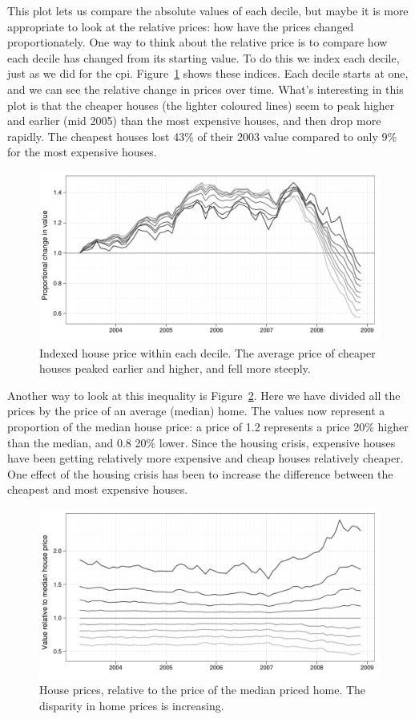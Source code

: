 \documentclass[oneside]{article}
\begin{document}
This plot lets us compare the absolute values of each decile, but maybe it is more appropriate to look at the relative prices: how have the prices changed proportionately.  One way to think about the relative price is to compare how each decile has changed from its starting value.  To do this we index each decile, just as we did for the {\sc cpi}. Figure~\ref{fig:decile-ind} shows these indices.  Each decile starts at one, and we can see the relative change in prices over time.  What's interesting in this plot is that the cheaper houses (the lighter coloured lines) seem to peak higher and earlier (mid 2005) than the most expensive houses, and then drop more rapidly.  The cheapest houses lost 43\% of their 2003 value compared to only 9\% for the most expensive houses.

\begin{figure}[htbp]
  \centering
  \includegraphics[width=0.75\linewidth]{decile-ind}
  \caption{Indexed house price within each decile.  The average price of cheaper houses peaked earlier and higher, and fell more steeply.}
  \label{fig:decile-ind}
\end{figure}

Another way to look at this inequality is Figure~\ref{fig:decile-rel}.  Here we have divided all the prices by the price of an average (median) home.  The values now represent a proportion of the median house price: a price of 1.2 represents a price 20\% higher than the median, and 0.8 20\% lower. Since the housing crisis, expensive houses have been getting relatively more expensive and cheap houses relatively cheaper.  One effect of the housing crisis has been to increase the difference between the cheapest and most expensive houses.

\begin{figure}[htbp]
  \centering
  \includegraphics[width=0.75\linewidth]{decile-rel}
  \caption{House prices, relative to the price of the median priced home.  The disparity in home prices is increasing.}
  \label{fig:decile-rel}
\end{figure}
\end{document}
